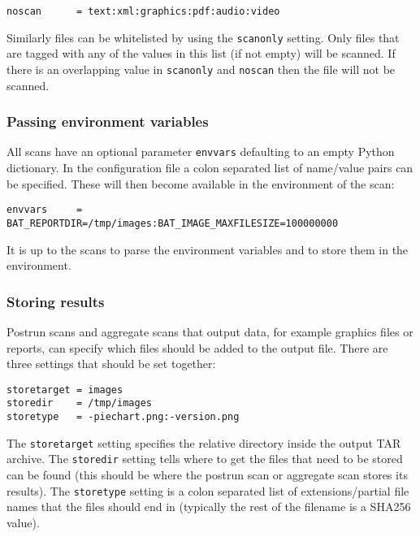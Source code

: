 \documentclass[10pt]{article}
\begin{document}
\begin{verbatim}
noscan      = text:xml:graphics:pdf:audio:video
\end{verbatim}

Similarly files can be whitelisted by using the \texttt{scanonly} setting. Only
files that are tagged with any of the values in this list (if not empty) will
be scanned. If there is an overlapping value in \texttt{scanonly} and
\texttt{noscan} then the file will not be scanned.

\subsubsection{Passing environment variables}

All scans have an optional parameter \texttt{envvars} defaulting to an empty
Python dictionary. In the configuration file a colon separated list of
name/value pairs can be specified. These will then become available in the
environment of the scan:

\begin{verbatim}
envvars     = BAT_REPORTDIR=/tmp/images:BAT_IMAGE_MAXFILESIZE=100000000
\end{verbatim}

It is up to the scans to parse the environment variables and to store them in
the environment.

\subsubsection{Storing results}

Postrun scans and aggregate scans that output data, for example graphics files
or reports, can specify which files should be added to the output file. There
are three settings that should be set together:

\begin{verbatim}
storetarget = images
storedir    = /tmp/images
storetype   = -piechart.png:-version.png
\end{verbatim}

The \texttt{storetarget} setting specifies the relative directory inside the
output TAR archive. The \texttt{storedir} setting tells where to get the files
that need to be stored can be found (this should be where the postrun scan
or aggregate scan stores its results). The \texttt{storetype} setting is a colon
separated list of extensions/partial file names that the files should end in
(typically the rest of the filename is a SHA256 value).
\end{document}
